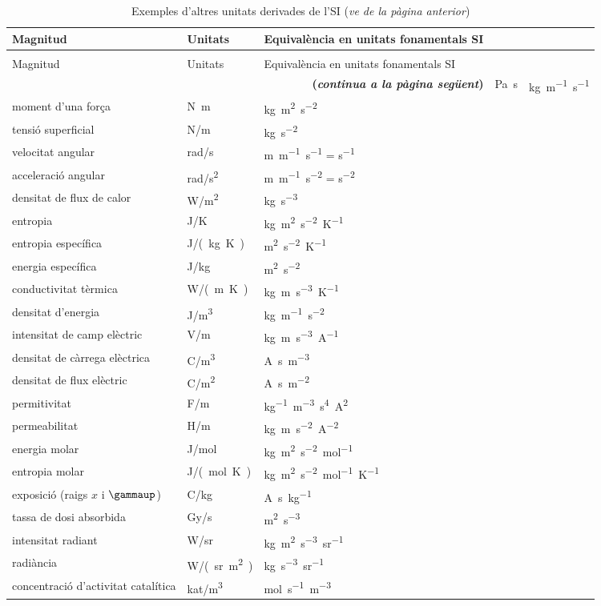 \begin{longtable}[h]{lll}
   \caption{\label{taula:SI-derivades-exemples} Exemples d'altres unitats derivades de
   l'SI}\\
   \toprule[1pt]
    Magnitud &  Unitats & Equivalència en unitats fonamentals SI\\
   \midrule
   \endfirsthead
   \caption[]{Exemples d'altres unitats derivades de l'SI (\emph{ve de la pàgina
   anterior})}\\
   \toprule[1pt]
    Magnitud &  Unitats & Equivalència en unitats fonamentals SI\\
   \midrule
   \endhead
   \midrule
   \multicolumn{3}{r}{\sffamily\bfseries\color{NavyBlue}(\emph{continua a la pàgina següent})}
   \endfoot
   \endlastfoot
   viscositat dinàmica &  \unit{Pa.s}& \unit{kg.m^{-1}.s^{-1}} \\
   moment d'una força & \unit{N.m} & \unit{kg.m^2.s^{-2}} \\
   tensió superficial &  \unit{N/m} &   \unit{kg.s^{-2}} \\
   velocitat angular & \unit{rad/s} & \unit{m.m^{-1}.s^{-1}} = \unit{s^{-1}} \\
   acceleració angular & \unit{rad/s^2} & \unit{m.m^{-1}.s^{-2}} = \unit{s^{-2}} \\
   densitat de flux de calor & \unit{W/m^2} & \unit{kg.s^{-3}} \\
   entropia & \unit{J/K} & \unit{kg.m^2.s^{-2}.K^{-1}} \\
   entropia específica & \unit{J/(kg.K)} &\unit{m^2.s^{-2}.K^{-1}} \\
   energia específica & \unit{J/kg} & \unit{m^2.s^{-2}} \\
   conductivitat tèrmica & \unit{W/(m.K)} & \unit{kg.m.s^{-3}.K^{-1}} \\
   densitat d'energia & \unit{J/m^3} & \unit{kg.m^{-1}.s^{-2}} \\
   intensitat de camp elèctric & \unit{V/m}& \unit{kg.m.s^{-3}.A^{-1}}  \\
   densitat de càrrega elèctrica & \unit{C/m^3} & \unit{A.s.m^{-3}} \\
   densitat de flux elèctric & \unit{C/m^2} & \unit{A.s.m^{-2}}\\
   permitivitat &  \unit{F/m}& \unit{kg^{-1}.m^{-3}.s^4.A^2} \\
   permeabilitat &  \unit{H/m} & \unit{kg.m.s^{-2}.A^{-2}} \\
   energia molar & \unit{J/mol} & \unit{kg.m^2.s^{-2}.mol^{-1}} \\
   entropia molar& \unit{J/(mol.K)} & \unit{kg.m^2.s^{-2}.mol^{-1}.K^{-1}} \\
   exposició (raigs $x$ i $\gammaup$) & \unit{C/kg} & \unit{A.s.kg^{-1}} \\
   tassa de dosi absorbida & \unit{Gy/s} & \unit{m^2.s^{-3}}\\
   intensitat radiant & \unit{W/sr} & \unit{kg.m^2.s^{-3}.sr^{-1}} \\
   radiància & \unit{W/(sr.m^2)} & \unit{kg.s^{-3}.sr^{-1}} \\
   concentració d'activitat catalítica &  \unit{kat/m^3} & \unit{mol.s^{-1}.m^{-3}}\\
    \bottomrule[1pt]
\end{longtable}
